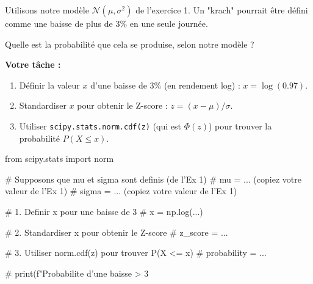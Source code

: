 \begin{exercicebox}
Utilisons notre modèle $\mathcal{N}(\mu, \sigma^2)$ de l'exercice 1. Un "krach" pourrait être défini comme une baisse de plus de 3\% en une seule journée.

Quelle est la probabilité que cela se produise, selon notre modèle ?

\textbf{Votre tâche :}
\begin{enumerate}
    \item Définir la valeur $x$ d'une baisse de 3\% (en rendement log) : $x = \log(0.97)$.
    \item Standardiser $x$ pour obtenir le Z-score : $z = (x - \mu) / \sigma$.
    \item Utiliser \texttt{scipy.stats.norm.cdf(z)} (qui est $\Phi(z)$) pour trouver la probabilité $P(X \le x)$.
\end{enumerate}

\begin{codecell}
from scipy.stats import norm

# Supposons que mu et sigma sont definis (de l'Ex 1)
# mu = ... (copiez votre valeur de l'Ex 1)
# sigma = ... (copiez votre valeur de l'Ex 1)

# 1. Definir x pour une baisse de 3%
# x = np.log(...)

# 2. Standardiser x pour obtenir le Z-score
# z_score = ...

# 3. Utiliser norm.cdf(z) pour trouver P(X <= x)
# probability = ...

# print(f"Probabilite d'une baisse > 3%
\end{codecell}
\end{exercicebox}

